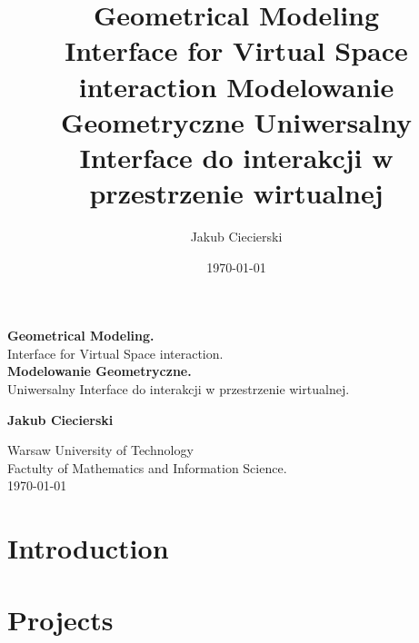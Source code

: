 \documentclass{book}
\title{
    {\bf Geometrical Modeling} \\ Interface for Virtual Space interaction    \vspace{50pt} {\bf Modelowanie Geometryczne} Uniwersalny Interface do interakcji w przestrzenie wirtualnej
}
\author{Jakub Ciecierski}
\date{\today}
\begin{document}
\begin{titlepage}
    \begin{center}

            \textbf{\huge  Geometrical Modeling.} \\ {\huge Interface for Virtual Space interaction.} \\ [0.5cm]
            
            \textbf{\huge  Modelowanie Geometryczne.} \\ {\huge Uniwersalny Interface do interakcji w przestrzenie wirtualnej.} \\ [0.5cm]
            
            \vspace*{\fill}

            \textbf{\large Jakub Ciecierski}

            \vspace*{\fill}
            
            \textnormal{\large Warsaw University of Technology \\ Factulty of Mathematics and Information Science. \\ \today}

    \end{center}
\end{titlepage}

\tableofcontents









\chapter*{Introduction}

\chapter{Projects}

\begin{thebibliography}{1}
    
    
\end{thebibliography}
\end{document}
